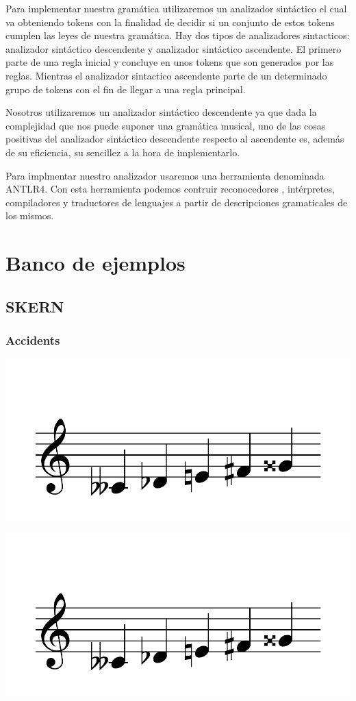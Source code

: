 \documentclass{article}
\begin{document}
Para implementar nuestra gramática utilizaremos un analizador sintáctico el cual va obteniendo tokens con la finalidad de
decidir si un conjunto de estos tokens cumplen las leyes de nuestra gramática. Hay dos tipos de analizadores sintacticos:
analizador sintáctico descendente y analizador sintáctico ascendente. El primero parte de una regla inicial y concluye en unos
tokens que son generados por las reglas. Mientras el analizador sintactico ascendente parte de un determinado grupo de tokens con
el fin de llegar a una regla principal.

Nosotros utilizaremos un analizador sintáctico descendente ya que dada la complejidad que nos puede suponer una gramática musical,
uno de las cosas positivas del analizador sintáctico descendente respecto al ascendente es, además de su eficiencia, su sencillez a
la hora de implementarlo.

Para implmentar nuestro analizador usaremos una herramienta denominada ANTLR4. Con esta herramienta podemos contruir reconocedores
, intérpretes, compiladores y traductores de lenguajes a partir de descripciones gramaticales de los mismos.

\section{Banco de ejemplos}
\subsection{SKERN}
\subsubsection{Accidents}
\includegraphics[scale=0.5]{figures_tests/pdf/skern/accident1.pdf}

\includegraphics[scale=0.5]{figures_tests/pdf/skern/accident2.pdf}
\end{document}
